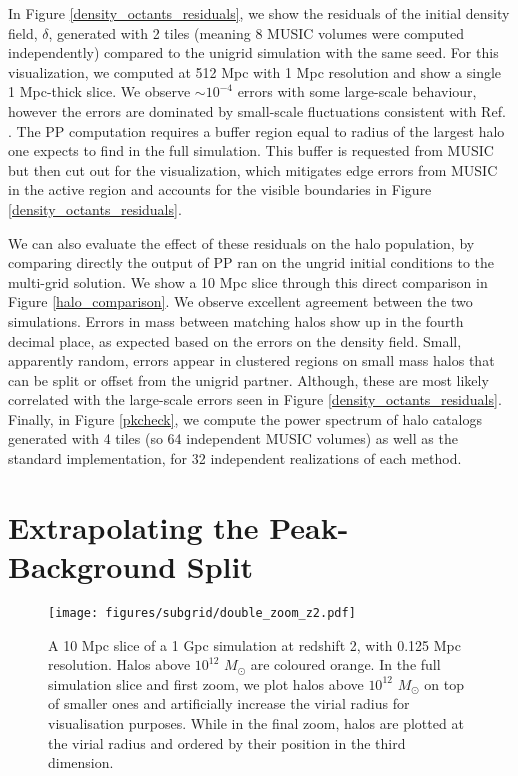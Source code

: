 In Figure \ref{density_octants_residuals}, we show the residuals of the initial density field, $\delta$, generated with 2 tiles (meaning 8 MUSIC volumes were computed independently) compared to the unigrid simulation with the same seed. For this visualization, we computed at 512 Mpc with 1 Mpc resolution and show a single 1 Mpc-thick slice. We observe $\sim 10^{-4}$ errors with some large-scale behaviour, however the errors are dominated by small-scale fluctuations consistent with Ref. \cite{music}. The PP computation requires a buffer region equal to radius of the largest halo one expects to find in the full simulation. This buffer is requested from MUSIC but then cut out for the visualization, which mitigates edge errors from MUSIC in the active region and accounts for the visible boundaries in Figure \ref{density_octants_residuals}.

We can also evaluate the effect of these residuals on the halo population, by comparing directly the output of PP ran on the ungrid initial conditions to the multi-grid solution.  We show a 10 Mpc slice through this direct comparison in Figure \ref{halo_comparison}. We observe excellent agreement between the two simulations. Errors in mass between matching halos show up in the fourth decimal place, as expected based on the errors on the density field. Small, apparently random, errors appear in clustered regions on small mass halos that can be split or offset from the unigrid partner. Although, these are most likely correlated with the large-scale errors seen in Figure \ref{density_octants_residuals}. Finally, in Figure \ref{pkcheck}, we compute the power spectrum of halo catalogs generated with 4 tiles (so 64 independent MUSIC volumes) as well as the standard implementation, for 32 independent realizations of each method.

\section{Extrapolating the Peak-Background Split}
\label{ch:signal:sec:epbs}

\begin{figure} %
\begin{center}
\texttt{[image: figures/subgrid/double\_zoom\_z2.pdf]}
\caption{A 10 Mpc slice of a 1 Gpc simulation at redshift 2, with 0.125 Mpc resolution. Halos above $10^{12}$ $M_\odot$ are coloured orange. In the full simulation slice and first zoom, we plot halos above $10^{12}$ $M_\odot$ on top of smaller ones and artificially increase the virial radius for visualisation purposes. While in the final zoom, halos are plotted at the virial radius and ordered by their position in the third dimension.}
\label{musicslice}
\end{center}
\end{figure}

